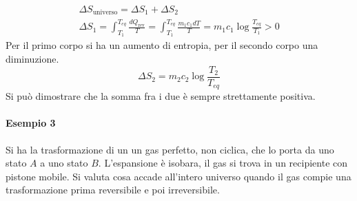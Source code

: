 \documentclass[10pt,a4paper]{book}
\begin{document}
\begin{gather*}
	\Delta S_{\text{universo}} = \Delta S_1 + \Delta S_2 \\
	\Delta S_1 = \int_{T_1 }^{T_{eq} } \frac{dQ_{\text{rev} } }{T } = \int_{T_1 }^{T_{eq} } \frac{m_1 c_1 dT}{T} = m_1 c_1\log \frac{T_{eq} }{T_1 } > 0
\end{gather*}
Per il primo corpo si ha un aumento di entropia, per il secondo corpo una diminuzione.
\[
	\Delta S_2 = m_2 c_2 \log \frac{T_2 }{T_{eq} }
\]
Si può dimostrare che la somma fra i due è sempre strettamente positiva.

\paragraph{Esempio 3} Si ha la trasformazione di un un gas perfetto, non ciclica, che lo porta da uno stato $A$ a uno stato $B$. L'espansione è isobara, il gas si trova in un recipiente con pistone mobile. Si valuta cosa accade all'intero universo quando il gas compie una trasformazione prima reversibile e poi irreversibile.
\end{document}
